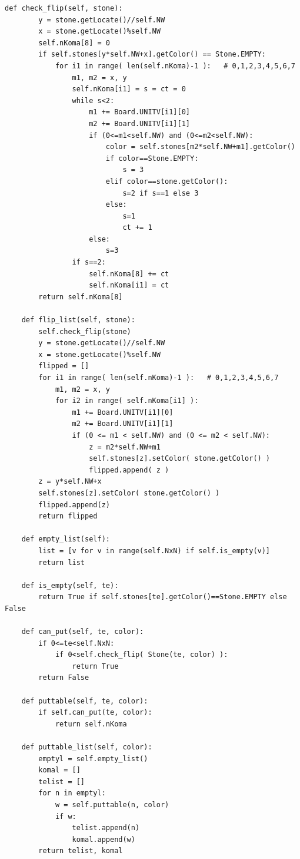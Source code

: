 \documentclass[uplatex,a4paper,11pt,oneside,openany]{jsbook}
\begin{document}
\begin{lstlisting}[caption=Board class,label=othello05]
    def check_flip(self, stone):
        y = stone.getLocate()//self.NW
        x = stone.getLocate()%self.NW
        self.nKoma[8] = 0
        if self.stones[y*self.NW+x].getColor() == Stone.EMPTY:
            for i1 in range( len(self.nKoma)-1 ):   # 0,1,2,3,4,5,6,7
                m1, m2 = x, y
                self.nKoma[i1] = s = ct = 0
                while s<2:
                    m1 += Board.UNITV[i1][0]
                    m2 += Board.UNITV[i1][1]
                    if (0<=m1<self.NW) and (0<=m2<self.NW):
                        color = self.stones[m2*self.NW+m1].getColor()
                        if color==Stone.EMPTY:
                            s = 3
                        elif color==stone.getColor():
                            s=2 if s==1 else 3
                        else:
                            s=1
                            ct += 1
                    else:
                        s=3
                if s==2:
                    self.nKoma[8] += ct
                    self.nKoma[i1] = ct
        return self.nKoma[8]

    def flip_list(self, stone):
        self.check_flip(stone)
        y = stone.getLocate()//self.NW
        x = stone.getLocate()%self.NW
        flipped = []
        for i1 in range( len(self.nKoma)-1 ):   # 0,1,2,3,4,5,6,7
            m1, m2 = x, y
            for i2 in range( self.nKoma[i1] ):
                m1 += Board.UNITV[i1][0]
                m2 += Board.UNITV[i1][1]
                if (0 <= m1 < self.NW) and (0 <= m2 < self.NW):
                    z = m2*self.NW+m1
                    self.stones[z].setColor( stone.getColor() )
                    flipped.append( z )
        z = y*self.NW+x
        self.stones[z].setColor( stone.getColor() )
        flipped.append(z)
        return flipped

    def empty_list(self):
        list = [v for v in range(self.NxN) if self.is_empty(v)]
        return list

    def is_empty(self, te):
        return True if self.stones[te].getColor()==Stone.EMPTY else False

    def can_put(self, te, color):
        if 0<=te<self.NxN:
            if 0<self.check_flip( Stone(te, color) ):
                return True
        return False

    def puttable(self, te, color):
        if self.can_put(te, color):
            return self.nKoma

    def puttable_list(self, color):
        emptyl = self.empty_list()
        komal = []
        telist = []
        for n in emptyl:
            w = self.puttable(n, color)
            if w:
                telist.append(n)
                komal.append(w)
        return telist, komal


\end{lstlisting}
\end{document}
